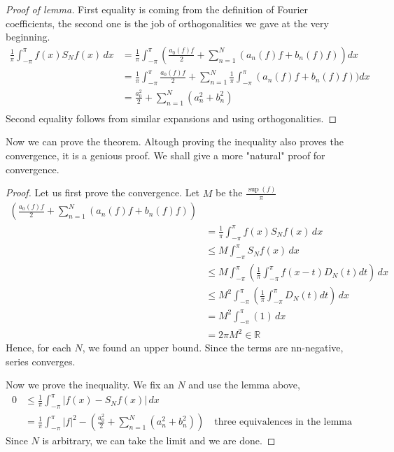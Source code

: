 \documentclass[12pt]{amsart}
\theoremstyle{definition}
\begin{document}
 \begin{proof}[Proof of lemma]
 First equality is coming from the definition of Fourier coefficients, the second one is the job of orthogonalities we gave at the very beginning.
 \[
 \begin{aligned}
     \frac{1}{\pi} \int_{-\pi}^{\pi} f(x)S_Nf(x) \, dx
         &= \frac{1}{\pi} \int_{-\pi}^{\pi} (\frac{a_0(f)f}{2} + \sum_{n=1}^{N} \left(a_n(f)f +
         b_n(f)f\right))dx \\
         &= \frac{1}{\pi} \int_{-\pi}^{\pi}\frac{a_0(f)f}{2} + \sum_{n=1}^{N} \frac{1}{\pi} \int_{-\pi}^{\pi} \left(a_n(f)f +
         b_n(f)f\right))dx \\
         &= \frac{a_0^2}{2} + \sum_{n=1}^{N} \left(a_n^2 +
         b_n^2\right)\\
 \end{aligned}
 \]
 Second equality follows from similar expansions and using orthogonalities.

 \end{proof}


    Now we can prove the theorem. Altough proving the inequality also proves the convergence, it is a genious proof. We shall give a more "natural" proof for convergence.


    \begin{proof}
        Let us first prove the convergence. Let $M$ be the $\frac{\sup(f)}{\pi}$
        \[
        \begin{aligned}
            (\frac{a_0(f)f}{2} + \sum_{n=1}^{N} \left(a_n(f)f +
         b_n(f)f\right)) \\
         &=  \frac{1}{\pi} \int_{-\pi}^{\pi} f(x)S_Nf(x) \, dx \\
         &\leq M \int_{-\pi}^{\pi}S_Nf(x) \, dx \\
         &\leq M \int_{-\pi}^{\pi}(\frac{1}{\pi} \int_{-\pi}^{\pi}f(x-t)D_N(t)dt) \, dx \\
         &\leq M^2  \int_{-\pi}^{\pi}(\frac{1}{\pi} \int_{-\pi}^{\pi}D_N(t)dt) \, dx \\
         &= M^2  \int_{-\pi}^{\pi}(1) \, dx \\
         &= 2\pi M^2 \in \mathbb{R}
        \end{aligned}
        \]
        Hence, for each $N$, we found an upper bound. Since the terms are nn-negative, series converges.

        Now we prove the inequality.
        We fix an $N$ and use the lemma above,
        \[
        \begin{aligned}
            0
            &\leq \frac{1}{\pi} \int_{-\pi}^{\pi} |f(x)-S_Nf(x)| \, dx \\
            &= \frac{1}{\pi} \int_{-\pi}^{\pi}|f|^2 - \left( \frac{a_0^2}{2} + \sum_{n=1}^{N} \left(a_n^2 + b_n^2\right) \right) \quad \text{three equivalences in the lemma}
        \end{aligned}
        \]
        Since $N$ is arbitrary, we can take the limit and we are done.
    \end{proof}
\end{document}
